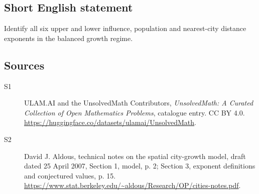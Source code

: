 \documentclass[11pt]{article}
\begin{document}
\subsection{Short English statement}
Identify all six upper and lower influence, population and nearest-city distance exponents in the balanced growth regime.
\subsection{Sources}
\begin{description}
\item[\hypertarget{source:statement:1}{S1}] ULAM.AI and the UnsolvedMath Contributors, \emph{UnsolvedMath: A Curated Collection of Open Mathematics Problems}, catalogue entry. CC BY 4.0. \url{https://huggingface.co/datasets/ulamai/UnsolvedMath}.
\item[\hypertarget{source:statement:2}{S2}] David J. Aldous, technical notes on the spatial city-growth model, draft dated 25 April 2007, Section 1, model, p. 2; Section 3, exponent definitions and conjectured values, p. 15. \url{https://www.stat.berkeley.edu/~aldous/Research/OP/cities-notes.pdf}.
\end{description}
\label{end:statement}
\end{document}
